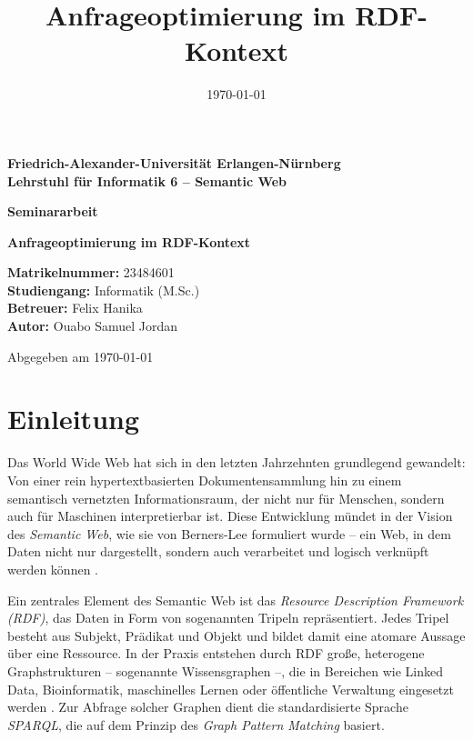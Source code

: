 \documentclass[12pt]{article}
\title{Anfrageoptimierung im RDF-Kontext}
\date{\today}
\begin{document}
\begin{titlepage}
\centering

\vspace*{2cm}

{\Large\bfseries Friedrich-Alexander-Universit{\"a}t Erlangen-N{\"u}rnberg\\[0.5ex]
Lehrstuhl für Informatik 6 – Semantic Web}

\vspace{2cm}

{\huge\bfseries Seminararbeit}

\vspace{1.5cm}

{\LARGE\bfseries Anfrageoptimierung im RDF-Kontext}

\vspace{1cm}

\textbf{Matrikelnummer:} 23484601\\
\textbf{Studiengang:} Informatik (M.Sc.)\\
\textbf{Betreuer:} Felix Hanika\\
\textbf{Autor:} Ouabo Samuel Jordan

\vfill

{\large Abgegeben am \today}

\end{titlepage}



\tableofcontents
\newpage

\section{Einleitung}

Das World Wide Web hat sich in den letzten Jahrzehnten grundlegend gewandelt: Von einer rein hypertextbasierten Dokumentensammlung hin zu einem semantisch vernetzten Informationsraum, der nicht nur für Menschen, sondern auch für Maschinen interpretierbar ist. Diese Entwicklung mündet in der Vision des \textit{Semantic Web}, wie sie von Berners-Lee formuliert wurde – ein Web, in dem Daten nicht nur dargestellt, sondern auch verarbeitet und logisch verknüpft werden können \cite{berners2001semantic}.

Ein zentrales Element des Semantic Web ist das \textit{Resource Description Framework (RDF)}, das Daten in Form von sogenannten Tripeln repräsentiert. Jedes Tripel besteht aus Subjekt, Prädikat und Objekt und bildet damit eine atomare Aussage über eine Ressource. In der Praxis entstehen durch RDF große, heterogene Graphstrukturen – sogenannte Wissensgraphen –, die in Bereichen wie Linked Data, Bioinformatik, maschinelles Lernen oder öffentliche Verwaltung eingesetzt werden \cite{hogan2021knowledge}. Zur Abfrage solcher Graphen dient die standardisierte Sprache \textit{SPARQL}, die auf dem Prinzip des \textit{Graph Pattern Matching} basiert.
\end{document}
